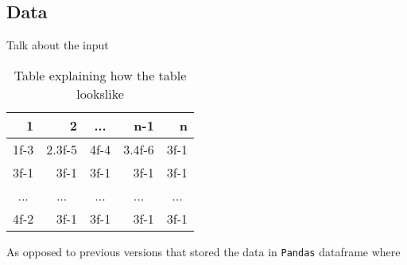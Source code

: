 \subsection{Data}

Talk about the input


\begin{table}[h]
\begin{tabular}{|r|r|r|r|r|}
\hline
\textbf{1}                & \textbf{2}               & \multicolumn{1}{c|}{\textbf{...}} & \textbf{n-1}             & \textbf{n}               \\ \hline
1f-3                      & 2.3f-5                   & 4f-4                              & 3.4f-6                   & 3f-1                     \\ \hline
3f-1                      & 3f-1                     & 3f-1                              & 3f-1                     & 3f-1                     \\ \hline
\multicolumn{1}{|c|}{...} & \multicolumn{1}{c|}{...} & \multicolumn{1}{c|}{...}          & \multicolumn{1}{c|}{...} & \multicolumn{1}{c|}{...} \\ \hline
4f-2                      & 3f-1                     & 3f-1                              & 3f-1                     & 3f-1                     \\ \hline
\end{tabular}
\caption{Table explaining how the table lookslike}
\label{fig:datatable}
\end{table}


As opposed to previous versions that stored the data in \texttt{Pandas} dataframe where 